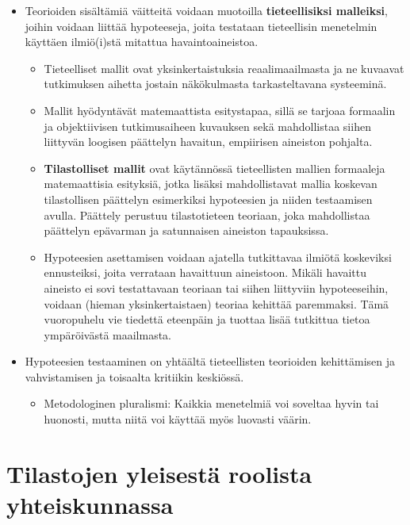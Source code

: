 \documentclass[
]{book}
\providecommand{\tightlist}{%
  \setlength{\itemsep}{0pt}\setlength{\parskip}{0pt}}
\begin{document}
\hfill\break

\begin{itemize}
\tightlist
\item
  Teorioiden sisältämiä väitteitä voidaan muotoilla \textbf{tieteellisiksi malleiksi}, joihin voidaan liittää hypoteeseja, joita testataan tieteellisin menetelmin käyttäen ilmiö(i)stä mitattua havaintoaineistoa.

  \begin{itemize}
  \tightlist
  \item
    Tieteelliset mallit ovat yksinkertaistuksia reaalimaailmasta ja ne kuvaavat tutkimuksen aihetta jostain näkökulmasta tarkasteltavana systeeminä.
  \item
    Mallit hyödyntävät matemaattista esitystapaa, sillä se tarjoaa formaalin ja objektiivisen tutkimusaiheen kuvauksen sekä mahdollistaa siihen liittyvän loogisen päättelyn havaitun, empiirisen aineiston pohjalta.
  \item
    \textbf{Tilastolliset mallit} ovat käytännössä tieteellisten mallien formaaleja matemaattisia esityksiä, jotka lisäksi mahdollistavat mallia koskevan tilastollisen päättelyn esimerkiksi hypoteesien ja niiden
    testaamisen avulla. Päättely perustuu tilastotieteen teoriaan, joka mahdollistaa päättelyn epävarman ja satunnaisen aineiston tapauksissa.
  \item
    Hypoteesien asettamisen voidaan ajatella tutkittavaa ilmiötä koskeviksi ennusteiksi, joita verrataan havaittuun aineistoon. Mikäli havaittu aineisto ei sovi testattavaan teoriaan tai siihen liittyviin hypoteeseihin, voidaan (hieman yksinkertaistaen) teoriaa kehittää paremmaksi. Tämä vuoropuhelu vie tiedettä eteenpäin ja tuottaa lisää tutkittua tietoa ympäröivästä maailmasta.
  \end{itemize}
\item
  Hypoteesien testaaminen on yhtäältä tieteellisten teorioiden kehittämisen ja vahvistamisen ja toisaalta kritiikin keskiössä.

  \begin{itemize}
  \tightlist
  \item
    Metodologinen pluralismi: Kaikkia menetelmiä voi soveltaa hyvin tai huonosti, mutta niitä voi käyttää myös luovasti väärin.
  \end{itemize}
\end{itemize}

\hypertarget{alaluku23}{%
\section{Tilastojen yleisestä roolista yhteiskunnassa}\label{alaluku23}}
\end{document}
